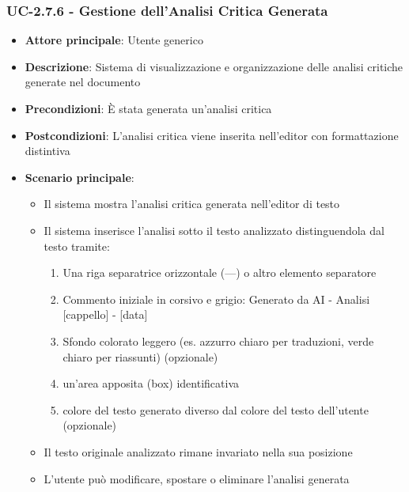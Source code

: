 \documentclass[11pt,a4paper]{article}
\begin{document}
\subsubsection{UC-2.7.6 - Gestione dell'Analisi Critica Generata}
\begin{itemize}
    \item \textbf{Attore principale}: Utente generico
    \item \textbf{Descrizione}: Sistema di visualizzazione e organizzazione delle analisi critiche generate nel documento
    \item \textbf{Precondizioni}: È stata generata un'analisi critica
    \item \textbf{Postcondizioni}: L'analisi critica viene inserita nell'editor con formattazione distintiva
    \item \textbf{Scenario principale}:
        \begin{itemize}
            \item Il sistema mostra l'analisi critica generata nell'editor di testo
            \item Il sistema inserisce l'analisi sotto il testo analizzato distinguendola dal testo tramite:
                \begin{enumerate}
                    \item Una riga separatrice orizzontale (---) o altro elemento separatore
                    \item Commento iniziale in corsivo e grigio: Generato da AI - Analisi [cappello] - [data]
                    \item Sfondo colorato leggero (es. azzurro chiaro per traduzioni, verde chiaro per riassunti) (opzionale)
                    \item un’area apposita (box) identificativa
                    \item colore del testo generato diverso dal colore del testo dell’utente (opzionale)
                \end{enumerate}
            \item Il testo originale analizzato rimane invariato nella sua posizione
            \item L'utente può modificare, spostare o eliminare l'analisi generata
        \end{itemize}
\end{itemize}
\end{document}
